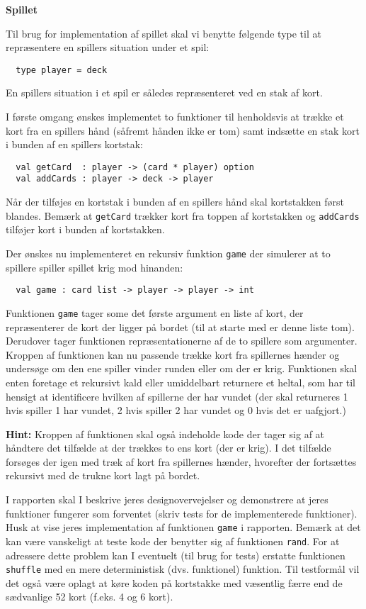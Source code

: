 \textbf{Spillet}

Til brug for implementation af spillet skal vi benytte følgende type
til at repræsentere en spillers situation under et spil:
\begin{lstlisting}
  type player = deck
\end{lstlisting}
En spillers situation i et spil er således repræsenteret ved en stak af kort.

I første omgang ønskes implementet to funktioner til henholdsvis at
trække et kort fra en spillers hånd (såfremt hånden ikke er tom) samt
indsætte en stak kort i bunden af en spillers kortstak:
\begin{lstlisting}
  val getCard  : player -> (card * player) option
  val addCards : player -> deck -> player
\end{lstlisting}
Når der tilføjes en kortstak i bunden af en spillers hånd skal
kortstakken først blandes. Bemærk at \lstinline{getCard} trækker kort
fra toppen af kortstakken og \lstinline{addCards} tilføjer kort i
bunden af kortstakken.

Der ønskes nu implementeret en rekursiv funktion \lstinline{game} der
simulerer at to spillere spiller spillet krig mod hinanden:
\begin{lstlisting}
  val game : card list -> player -> player -> int
\end{lstlisting}
Funktionen \lstinline{game} tager some det første argument en liste af
kort, der repræsenterer de kort der ligger på bordet (til at starte
med er denne liste tom). Derudover tager funktionen repræsentationerne
af de to spillere som argumenter. Kroppen af funktionen kan nu
passende trække kort fra spillernes hænder og undersøge om den ene
spiller vinder runden eller om der er krig. Funktionen skal enten
foretage et rekursivt kald eller umiddelbart returnere et heltal, som
har til hensigt at identificere hvilken af spillerne der har vundet
(der skal returneres 1 hvis spiller 1 har vundet, 2 hvis spiller 2 har
vundet og 0 hvis det er uafgjort.)

\textbf{Hint:} Kroppen af funktionen skal også indeholde kode der tager
sig af at håndtere det tilfælde at der trækkes to ens kort (der er
krig). I det tilfælde forsøges der igen med træk af kort fra
spillernes hænder, hvorefter der fortsættes rekursivt med de trukne
kort lagt på bordet.

I rapporten skal I beskrive jeres designovervejelser og demonstrere at
jeres funktioner fungerer som forventet (skriv tests for de
implementerede funktioner). Husk at vise jeres implementation af
funktionen \lstinline{game} i rapporten. Bemærk at det kan være
vanskeligt at teste kode der benytter sig af
funktionen \lstinline{rand}. For at adressere dette problem kan I
eventuelt (til brug for tests) erstatte funktionen \lstinline{shuffle}
med en mere deterministisk (dvs. funktionel) funktion. Til testformål
vil det også være oplagt at køre koden på kortstakke med væsentlig
færre end de sædvanlige 52 kort (f.eks. 4 og 6 kort).
